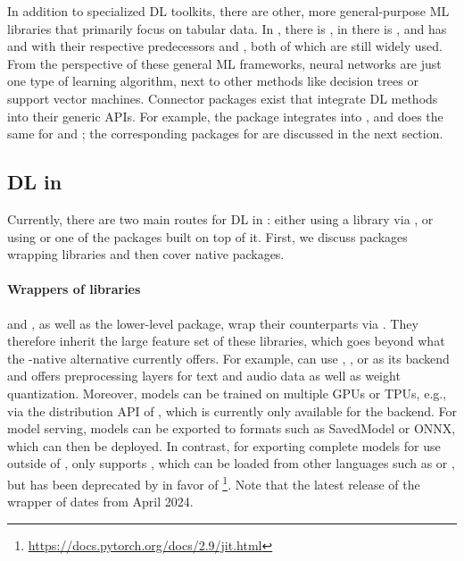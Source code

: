 \documentclass[article,shortnames]{jss}
\theoremstyle{definition}
\begin{document}
In addition to specialized DL toolkits, there are other, more general-purpose ML libraries that primarily focus on tabular data.
In \python, there is \sklearn{} \citep{ref-pedregosa2011scikit-learn}, in \julia{} there is \mlj{} \citep{ref-blaom2020mlj}, and \rlang{} has \tidymodels{} \citep{ref-kuhn2020tidymodels} and  \citep{ref-mlr32019} with their respective predecessors  \citep{ref-kuhn2008building} and  \citep{ref-bischl2016mlr}, both of which are still widely used.
From the perspective of these general ML frameworks, neural networks are just one type of learning algorithm, next to other methods like decision trees or support vector machines.
Connector packages exist that integrate DL methods into their generic APIs.
For example, the  package \citep{ref-skorch} integrates \pytorch{} into \sklearn{}, and  \citep{ref-MLJFlux} does the same for \flux{} and \mlj{}; the corresponding \rlang{} packages for \tidymodels{} are discussed in the next section.

\subsection[DL in R]{DL in \rlang{}}\label{sec:dl-in-r}

Currently, there are two main routes for DL in \rlang{}: either using a \python{} library via  \citep{ref-reticulate2025}, or using \torch{} \citep{ref-torch2025} or one of the packages built on top of it.
First, we discuss packages wrapping \python{} libraries and then cover native \rlang{} packages.

\paragraph{Wrappers of \python{} libraries}
 \citep{ref-keras32025} and  \citep{ref-fastai}, as well as the lower-level  \citep{ref-r-tensorflow2024} package, wrap their \python{} counterparts via  \citep{ref-reticulate2025}.
They therefore inherit the large feature set of these libraries, which goes beyond what the \rlang{}-native alternative \torch{} currently offers.
For example,  can use \tensorflow{} \citep{ref-abadi2016tensorflow}, \jax{} \citep{ref-jax2018github}, or \pytorch{} \citep{ref-pytorch} as its backend and offers preprocessing layers for text and audio data as well as weight quantization.
Moreover, models can be trained on multiple GPUs or TPUs, e.g., via the distribution API of \keras{}, which is currently only available for the \jax{} backend.
For model serving,  models can be exported to formats such as SavedModel or ONNX, which can then be deployed.
In contrast, for exporting complete models for use outside of \rlang{}, \torch{} only supports , which can be loaded from other languages such as \python{} or \cpp{}, but has been deprecated by \pytorch{} in favor of \footnote{\url{https://docs.pytorch.org/docs/2.9/jit.html}}.
Note that the latest release of the \rlang{} wrapper of  dates from April 2024.
\end{document}
